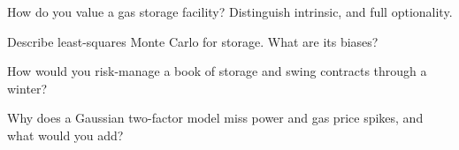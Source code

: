 \begin{interviewq}\label{iq:rc:commodity-and-energy-derivatives:3}
How do you value a gas storage facility? Distinguish intrinsic,  and full
optionality.
\end{interviewq}

\begin{interviewq}\label{iq:rc:commodity-and-energy-derivatives:4}
Describe least-squares Monte Carlo for storage. What are its biases?
\end{interviewq}

\begin{interviewq}\label{iq:rc:commodity-and-energy-derivatives:5}
How would you risk-manage a book of storage and swing contracts through a winter?
\end{interviewq}

\begin{interviewq}\label{iq:rc:commodity-and-energy-derivatives:6}
Why does a Gaussian two-factor model miss power and gas price spikes, and what would you
add?
\end{interviewq}
